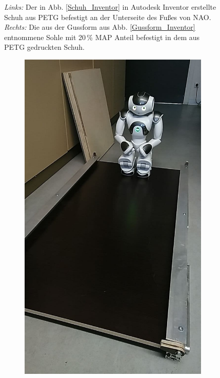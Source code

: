 \begin{figure}[htb]
\begin{subfigure}[c]{0.622\linewidth}
	\end{subfigure}
	\hfill
	\caption{\textit{Links:} Der in Abb. \ref{Schuh_Inventor} in Autodesk Inventor erstellte Schuh aus PETG befestigt an der Unterseite des Fußes von NAO. \textit{Rechts:} Die aus der Gussform aus Abb. \ref{Gussform_Inventor} entnommene Sohle mit 20\,\% MAP Anteil befestigt in dem aus PETG gedruckten Schuh.}
	\label{nao_mit_schuhen}
\end{figure}

\begin{figure}[htb]
	\hfill
	\begin{subfigure}[c]{0.4\linewidth}
		\centering
		\includegraphics[width=\linewidth]{Bilder/NAO_auf_Rampe2.jpg}

\end{subfigure}
\end{figure}
